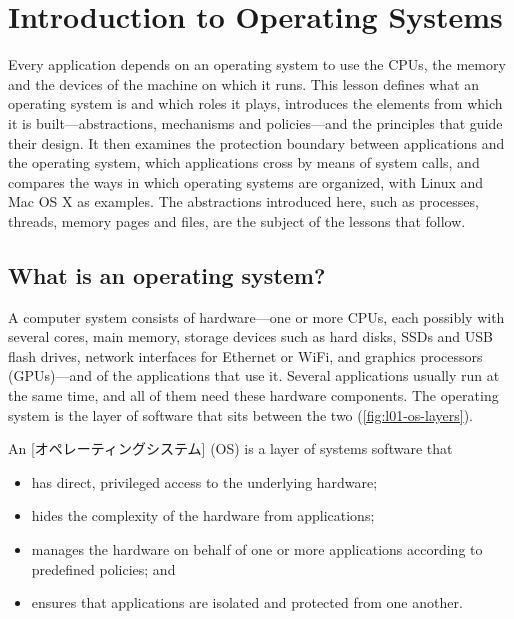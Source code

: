 \documentclass[../main.tex]{subfiles}
\begin{document}
\chapter{Introduction to Operating Systems}

Every application depends on an operating system to use the CPUs, the
memory and the devices of the machine on which it runs.  This lesson defines
what an operating system is and which roles it plays, introduces the
elements from which it is built---abstractions, mechanisms and
policies---and the principles that guide their design.  It then examines
the protection boundary between applications and the operating system,
which applications cross by means of system calls, and compares the ways in
which operating systems are organized, with Linux and Mac OS X as examples.
The abstractions introduced here, such as processes, threads, memory pages
and files, are the subject of the lessons that follow.

\section{What is an operating system?}
\label{sec:l01-what}

A computer system consists of hardware---one or more CPUs, each possibly
with several cores, main memory, storage devices such as hard disks, SSDs
and USB flash drives, network interfaces for Ethernet or WiFi, and graphics
processors (GPUs)---and of the applications that use
it.  Several applications usually run
at the same time, and all of them need these hardware components.  The
operating system is the layer of software that sits between the two
(\cref{fig:l01-os-layers}).

\begin{definition}
  An [オペレーティングシステム] (OS) is a layer of
  systems software that
  \begin{itemize}
    \item has direct, privileged access to the underlying hardware;
    \item hides the complexity of the hardware from applications;
    \item manages the hardware on behalf of one or more applications
      according to predefined policies; and
    \item ensures that applications are isolated and protected from one
      another.
  \end{itemize}
\end{definition}
\end{document}
